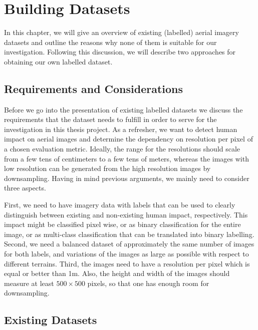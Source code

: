 
\chapter{Building Datasets} %

\label{Chapter3} %


In this chapter, we will give an overview of existing (labelled) aerial imagery datasets and outline the reasons why none of them is suitable for our investigation. Following this discussion, we will describe two approaches for obtaining our own labelled dataset.

\section{Requirements and Considerations}

Before we go into the presentation of existing labelled datasets we discuss the requirements that the dataset needs to fulfill in order to serve for the investigation in this thesis project. As a refresher, we want to detect human impact on aerial images and determine the dependency on resolution per pixel of a chosen evaluation metric. Ideally, the range for the resolutions should scale from a few tens of centimeters to a few tens of meters, whereas the images with low resolution can be generated from the high resolution images by downsampling. Having in mind previous arguments, we mainly need to consider three aspects. 

First, we need to have imagery data with labels that can be used to clearly distinguish between existing and non-existing human impact, respectively. This impact might be classified pixel wise, or as binary classification for the entire image, or as multi-class classification that can be translated into binary labelling. Second, 
we need a balanced dataset of approximately the same number of images for both labels, and variations of the images as large as possible with respect to different terrains. Third, the images need to have a resolution per pixel which is equal or better than 1m. Also, the height and width of the images should measure at least $500\times500$ pixels, so that one has enough room for downsampling. 

\section{Existing Datasets}

